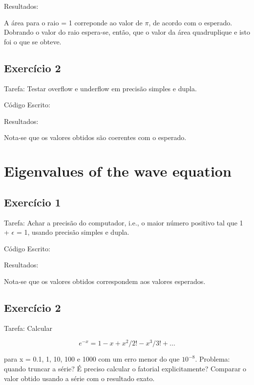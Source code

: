 \documentclass[12pt, a4paper]{article} %
\begin{document}
        Resultados:

        A \'area para o raio = 1 correponde ao valor de $\pi$, de acordo com o esperado. Dobrando o valor do raio espera-se, então, que o valor da \'area quadruplique e isto foi o que se obteve.

    \subsection{Exerc\'icio 2}

        Tarefa: Testar overflow e underflow em precis\~ao simples e dupla.

        C\'odigo Escrito:
        

        Resultados:

        Nota-se que os valores obtidos s\~ao coerentes com o esperado.

\section{Eigenvalues of the wave equation}

    \subsection{Exerc\'icio 1}

        Tarefa: Achar a precis\~ao  do computador, i.e., o maior n\'umero positivo  tal que
        1 + $\epsilon$ = 1, usando precis\~ao simples e dupla.

        C\'odigo Escrito:
        

        Resultados:

        Nota-se que os valores obtidos correspondem aos valores esperados.

    \subsection{Exerc\'icio 2}

        Tarefa: Calcular

        \begin{equation} e^{-x} = 1 - x + x^2/2! - x^3/3! + ... \end{equation}

        para x = 0.1, 1, 10, 100 e 1000 com um erro menor do que $10^{-8}$. Problema: quando truncar a s\'erie? \'E preciso calcular o fatorial explicitamente? Comparar o valor obtido usando a s\'erie com o resultado exato.
\end{document}
